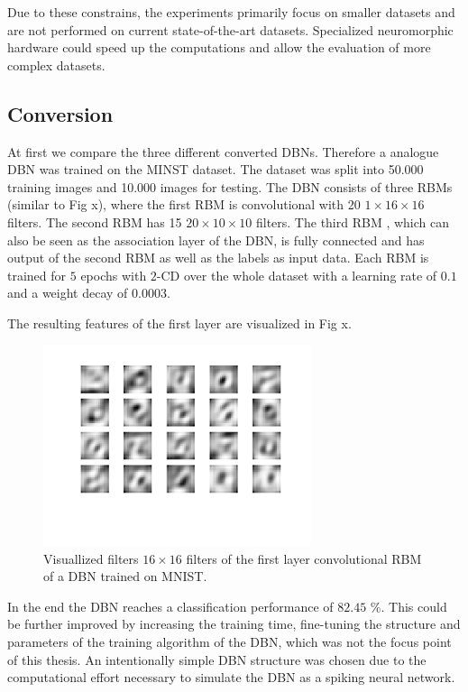 Due to these constrains, the experiments primarily focus on smaller datasets and are not performed on current state-of-the-art datasets. 
Specialized neuromorphic hardware could speed up the computations and allow the evaluation of more complex datasets.  

\subsection{Conversion}

At first we compare the three different converted DBNs.
Therefore a analogue DBN was trained on the MINST dataset.
The dataset was split into 50.000 training images and 10.000 images for testing.
The DBN consists of three RBMs (similar to Fig x), where the first RBM is convolutional with 20 $1 \times 16 \times 16$ filters. 
The second RBM has 15 $20 \times 10 \times 10$ filters. 
The third RBM , which can also be seen as the association layer of the DBN, is fully connected and has output of the second RBM as well as the labels as input data.  
Each RBM is trained for $5$ epochs with $2$-CD over the whole dataset with a learning rate of $0.1$ and a weight decay of $0.0003$.

The resulting features of the first layer are visualized in Fig x.

\begin{figure}
	\centering
    	\includegraphics[width=0.7\textwidth]{imgs/weights_rbm.png} 
    \caption{Visuallized filters $16 \times 16$ filters of the first layer convolutional RBM of a DBN trained on MNIST.}
	\label{fig:rbmw}
\end{figure}

In the end the DBN reaches a classification performance of $82.45$ \%. 
This could be further improved by increasing the training time, fine-tuning the structure and parameters of the training algorithm of the DBN, which was not the focus point of this thesis.
An intentionally simple DBN structure was chosen due to the computational effort necessary to simulate the DBN as a spiking neural network. 


